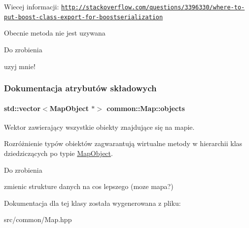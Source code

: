 Wiecej informacji\-: \href{http://stackoverflow.com/questions/3396330/where-to-put-boost-class-export-for-boostserialization}{\tt http\-://stackoverflow.\-com/questions/3396330/where-\/to-\/put-\/boost-\/class-\/export-\/for-\/boostserialization}

Obecnie metoda nie jest uzywana

\begin{DoxyRefDesc}{Do zrobienia}
\item[\hyperlink{todo__todo000008}{Do zrobienia}]uzyj mnie! \end{DoxyRefDesc}


\subsubsection{Dokumentacja atrybutów składowych}
\hypertarget{classcommon_1_1Map_a810206d6817e73a9f60344c42ce40178}{
\paragraph[{objects}]{\setlength{\rightskip}{0pt plus 5cm}std\-::vector$<${\bf Map\-Object} $\ast$$>$ common\-::\-Map\-::objects\hspace{0.3cm}{\ttfamily [protected]}}}\label{classcommon_1_1Map_a810206d6817e73a9f60344c42ce40178}


Wektor zawierający wszystkie obiekty znajdujące się na mapie. 

Rozróżnienie typów obiektów zagwarantują wirtualne metody w hierarchii klas dziedziczących po typie \hyperlink{classcommon_1_1MapObject}{Map\-Object}.

\begin{DoxyRefDesc}{Do zrobienia}
\item[\hyperlink{todo__todo000007}{Do zrobienia}]zmienic strukture danych na cos lepszego (moze mapa?) \end{DoxyRefDesc}


Dokumentacja dla tej klasy została wygenerowana z pliku\-:\begin{DoxyCompactItemize}
\item 
src/common/Map.\-hpp\end{DoxyCompactItemize}
